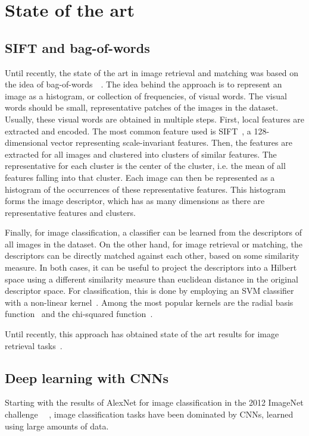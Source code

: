 
\chapter{State of the art}
\section{SIFT and bag-of-words}
Until recently, the state of the art in image retrieval and matching
was based on the idea of
bag-of-words~\cite{philbin_object_2007}~\cite{mikulik_learning_2013}.
The idea behind the approach is to represent an image as a histogram,
or collection of frequencies, of visual words. The visual words should
be small, representative patches of the images in the dataset.
Usually, these visual words are obtained in multiple steps. First,
local features are extracted and encoded. The most common feature used
is SIFT~\cite{lowe_distinctive_2004}, a 128-dimensional vector representing
scale-invariant features. Then, the features are extracted for all
images and clustered into clusters of similar features.
The representative for each cluster is the center of the cluster,
i.e. the mean of all features falling into that cluster.
Each image can then be represented as a histogram of the occurrences
of these representative features.
This histogram forms the image descriptor, which has as many dimensions
as there are representative features and clusters.

Finally, for image classification, a classifier can be learned from the
descriptors of all images in the dataset. On the other hand, for image
retrieval or matching, the descriptors can be directly matched against
each other, based on some similarity measure.
In both cases, it can be useful to project the descriptors into a Hilbert
space using a different similarity measure than euclidean distance
in the original descriptor space.
For classification, this is done by employing an SVM classifier with a
non-linear kernel~\cite{shawe-taylor_kernel_2004}.
Among the most popular kernels are the
radial basis function~\cite{scholkopf_comparing_1997}
and the chi-squared function~\cite{vedaldi_efficient_2012}.

Until recently, this approach has obtained state of the art results for
image retrieval tasks~\cite{mikulik_learning_2013}.

\section{Deep learning with CNNs}
Starting with the results of AlexNet for image classification in the 2012
ImageNet challenge~\cite{krizhevsky_imagenet_2012}
~\cite{russakovsky_imagenet_2015},
image classification tasks have been dominated by CNNs, learned using
large amounts of data.


